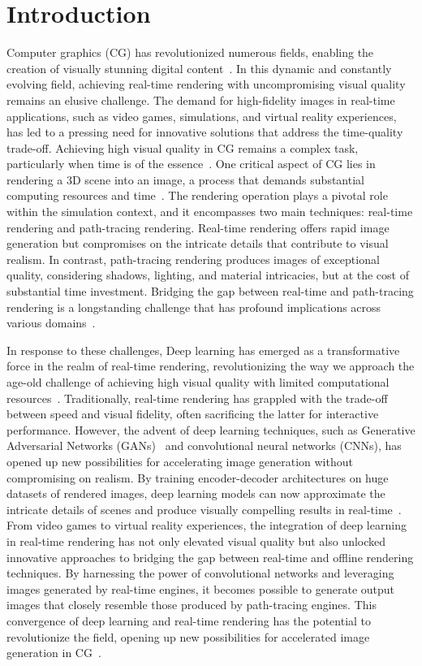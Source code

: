 \section{Introduction}
\label{sec:introduction}
Computer graphics (CG) has revolutionized numerous fields, enabling the creation of visually stunning digital content~\cite{mamurova2023role}.
In this dynamic and constantly evolving field, achieving real-time rendering with uncompromising visual quality remains an elusive challenge. The demand for high-fidelity images in real-time applications, such as video games, simulations, and virtual reality experiences, has led to a pressing need for innovative solutions that address the time-quality trade-off. Achieving high visual quality in CG remains a complex task, particularly when time is of the essence~\cite{agoston2005computer}. One critical aspect of CG lies in rendering a 3D scene into an image, a process that demands substantial computing resources and time~\cite{peresunko2021models}. The rendering operation plays a pivotal role within the simulation context, and it encompasses two main techniques: real-time rendering and path-tracing rendering. Real-time rendering offers rapid image generation but compromises on the intricate details that contribute to visual realism. In contrast, path-tracing rendering produces images of exceptional quality, considering shadows, lighting, and material intricacies, but at the cost of substantial time investment. Bridging the gap between real-time and path-tracing rendering is a longstanding challenge that has profound implications across various domains~\cite{wu2020analytic}.

In response to these challenges, Deep learning has emerged as a transformative force in the realm of real-time rendering, revolutionizing the way we approach the age-old challenge of achieving high visual quality with limited computational resources~\cite{xiao2020neural}. Traditionally, real-time rendering has grappled with the trade-off between speed and visual fidelity, often sacrificing the latter for interactive performance. However, the advent of deep learning techniques, such as Generative Adversarial Networks (GANs)~\cite{goodfellow2020generative} and convolutional neural networks (CNNs), has opened up new possibilities for accelerating image generation without compromising on realism. By training encoder-decoder architectures on huge datasets of rendered images, deep learning models can now approximate the intricate details of scenes and produce visually compelling results in real-time~\cite{shi2021towards}. From video games to virtual reality experiences, the integration of deep learning in real-time rendering has not only elevated visual quality but also unlocked innovative approaches to bridging the gap between real-time and offline rendering techniques. By harnessing the power of convolutional networks and leveraging images generated by real-time engines, it becomes possible to generate output images that closely resemble those produced by path-tracing engines. This convergence of deep learning and real-time rendering has the potential to revolutionize the field, opening up new possibilities for accelerated image generation in CG~\cite{shi2021towards}.

